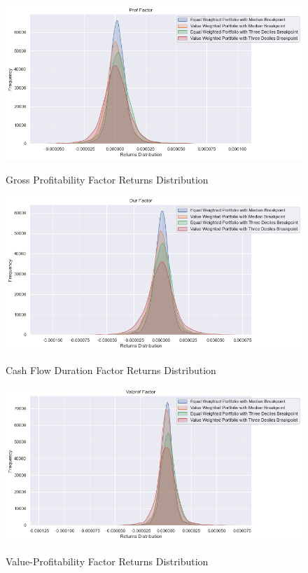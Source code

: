 \begin{figure}[H]
	\caption{Gross Profitability Factor Returns Distribution}
	\centering
	\includegraphics[scale=.63]{../../output/figures/prof.png}
	\label{fig:prof}
\end{figure}

\begin{figure}[H]
	\caption{Cash Flow Duration Factor Returns Distribution}
	\centering
	\includegraphics[scale=.63]{../../output/figures/dur.png}
	\label{fig:dur}
\end{figure}

\begin{figure}[H]
	\caption{Value-Profitability Factor Returns Distribution}
	\centering
	\includegraphics[scale=.63]{../../output/figures/valprof.png}
	\label{fig:valprof}
\end{figure}

